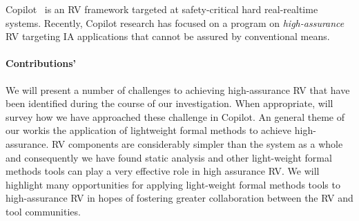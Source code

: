 Copilot~\cite{copilot, pike-isse-13}  is an RV framework  targeted at
safety-critical hard real-realtime systems. Recently, Copilot research
has  focused on a program on \emph{high-assurance} RV targeting IA
applications that cannot be assured by conventional means. 


\paragraph{Contributions'} We will present a number of challenges to
achieving high-assurance RV that have been identified during the
course of our investigation.  When appropriate, will survey how we
have approached these challenge in Copilot.  An general theme of our
workis the application of lightweight formal methods to achieve
high-assurance.  RV components are considerably simpler than the
system as a whole and consequently we have found static analysis and
other light-weight formal methods tools can play a very effective role
in high assurance RV.  We will highlight many opportunities for
applying light-weight formal methods tools to high-assurance RV in
hopes of fostering greater collaboration between the RV and tool
communities.
